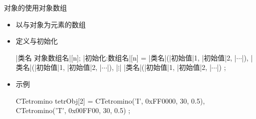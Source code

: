 \begin{frame}[t, fragile]{对象的使用}{对象数组}%
  \begin{itemize}
  \item 以与对象为元素的数组
  \item 定义与初始化\\
    \begin{center}
      \begin{minipage}{0.8\linewidth}
        \begin{cpptt}
|类名 对象数组名|[n];
|初始化:数组名|[n] = {|类名|(|初始值|1, |初始值|2, |$\cdots$|),
                     |类名|(|初始值|1, |初始值|2, |$\cdots$|),
                                     |$\vdots$|
                     |类名|(|初始值|1, |初始值|2, |$\cdots$|)
                    };
        \end{cpptt}
      \end{minipage}
    \end{center}
  \item 示例
    \begin{center}
      \begin{minipage}{0.8\linewidth}
        \begin{cppcode}
CTetromino tetrObj[2] = {CTetromino('I', 0xFF0000, 30, 0.5),
                         CTetromino('T', 0x00FF00, 30, 0.5)
                        };
        \end{cppcode}
      \end{minipage}
    \end{center}
  \end{itemize}
\end{frame}

